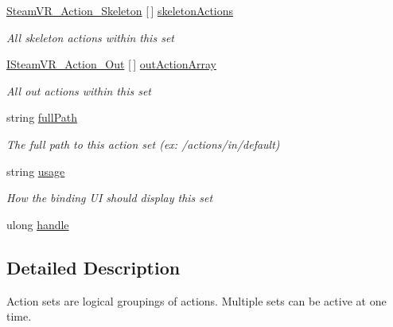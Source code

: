 \begin{DoxyCompactItemize}
\mbox{\hyperlink{class_valve_1_1_v_r_1_1_steam_v_r___action___skeleton}{Steam\+V\+R\+\_\+\+Action\+\_\+\+Skeleton}} \mbox{[}$\,$\mbox{]} \mbox{\hyperlink{interface_valve_1_1_v_r_1_1_i_steam_v_r___action_set_a210d3ca82c352f4fe3a118bdd7b9bf41}{skeleton\+Actions}}
\begin{DoxyCompactList}\small\item\em All skeleton actions within this set \end{DoxyCompactList}\item 
\mbox{\hyperlink{interface_valve_1_1_v_r_1_1_i_steam_v_r___action___out}{I\+Steam\+V\+R\+\_\+\+Action\+\_\+\+Out}} \mbox{[}$\,$\mbox{]} \mbox{\hyperlink{interface_valve_1_1_v_r_1_1_i_steam_v_r___action_set_af3c023e053ace0872cb8baf6a78dce10}{out\+Action\+Array}}
\begin{DoxyCompactList}\small\item\em All out actions within this set \end{DoxyCompactList}\item 
string \mbox{\hyperlink{interface_valve_1_1_v_r_1_1_i_steam_v_r___action_set_a5dcb383445b3a9190f5331901cf0112b}{full\+Path}}
\begin{DoxyCompactList}\small\item\em The full path to this action set (ex\+: /actions/in/default) \end{DoxyCompactList}\item 
string \mbox{\hyperlink{interface_valve_1_1_v_r_1_1_i_steam_v_r___action_set_a3a9a545f8fe81d35957692d330d388f4}{usage}}
\begin{DoxyCompactList}\small\item\em How the binding UI should display this set \end{DoxyCompactList}\item 
ulong \mbox{\hyperlink{interface_valve_1_1_v_r_1_1_i_steam_v_r___action_set_a8cfb19ea55d96ea552488ec1e7498da4}{handle}}
\end{DoxyCompactItemize}


\subsection{Detailed Description}
Action sets are logical groupings of actions. Multiple sets can be active at one time. 



